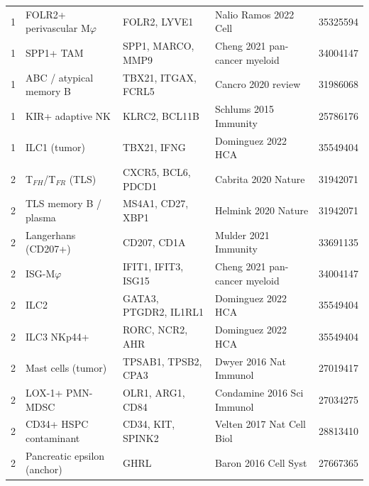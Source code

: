 \begin{table}[h]
\begin{tabular}{@{}l l p{32mm} p{32mm} l@{}}
1 & FOLR2+ perivascular M$\varphi$    & FOLR2, LYVE1               & Nalio Ramos 2022 Cell         & 35325594 \\
1 & SPP1+ TAM                         & SPP1, MARCO, MMP9          & Cheng 2021 pan-cancer myeloid & 34004147 \\
1 & ABC / atypical memory B           & TBX21, ITGAX, FCRL5        & Cancro 2020 review            & 31986068 \\
1 & KIR+ adaptive NK                  & KLRC2, BCL11B              & Schlums 2015 Immunity         & 25786176 \\
1 & ILC1 (tumor)                      & TBX21, IFNG                & Dominguez 2022 HCA            & 35549404 \\
2 & T$_{FH}$/T$_{FR}$ (TLS)           & CXCR5, BCL6, PDCD1         & Cabrita 2020 Nature           & 31942071 \\
2 & TLS memory B / plasma             & MS4A1, CD27, XBP1          & Helmink 2020 Nature           & 31942071 \\
2 & Langerhans (CD207+)               & CD207, CD1A                & Mulder 2021 Immunity          & 33691135 \\
2 & ISG-M$\varphi$                    & IFIT1, IFIT3, ISG15        & Cheng 2021 pan-cancer myeloid & 34004147 \\
2 & ILC2                              & GATA3, PTGDR2, IL1RL1      & Dominguez 2022 HCA            & 35549404 \\
2 & ILC3 NKp44+                       & RORC, NCR2, AHR            & Dominguez 2022 HCA            & 35549404 \\
2 & Mast cells (tumor)                & TPSAB1, TPSB2, CPA3        & Dwyer 2016 Nat Immunol        & 27019417 \\
2 & LOX-1+ PMN-MDSC                   & OLR1, ARG1, CD84           & Condamine 2016 Sci Immunol    & 27034275 \\
2 & CD34+ HSPC contaminant            & CD34, KIT, SPINK2          & Velten 2017 Nat Cell Biol     & 28813410 \\
2 & Pancreatic epsilon (anchor)       & GHRL                       & Baron 2016 Cell Syst          & 27667365 \\
\bottomrule
\end{tabular}
\end{table}
